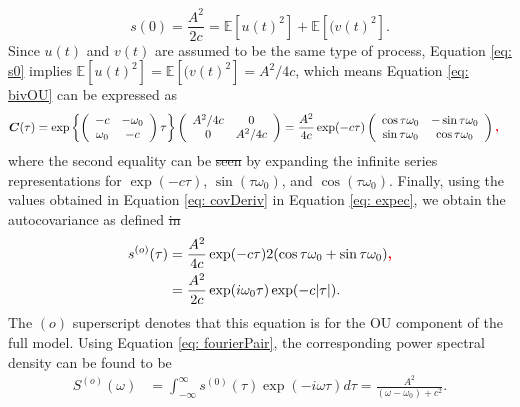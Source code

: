 \documentclass{stat572Style}
\newcommand{\vmdel}[1]{\sout{#1}}
\newcommand{\vmadd}[1]{\textbf{\color{red}{#1}}}
\begin{document}
\begin{equation}
\label{eq: s0}
s(0) = \frac{A^{2}}{2c} =  \mathbb{E}[u(t)^{2}] + \mathbb{E}[(v(t)^{2}]. 
\end{equation}
Since $u(t)$ and $v(t)$ are assumed to be the same type of process, Equation \eqref{eq: s0} implies $\mathbb{E}[u(t)^{2}] =\mathbb{E}[(v(t)^{2}] = A^{2}/4c$, which means Equation \eqref{eq: bivOU} can be expressed as 
\begin{align}
\label{eq: covDeriv}
 \boldsymbol{C}(\tau) =  \exp \left\{ \left( \begin{array}{cc} -c & -\omega_{0} \\ \omega_{0} & -c \end{array} \right)\tau \right\} \left( \begin{array}{cc} A^{2}/4c & 0 \\ 0 & A^{2}/4c \end{array} \right)  &= 
\frac{A^{2}}{4c} \exp (-c \tau) \left( \begin{array}{cc} \cos \tau \omega_{0} & - \sin \tau \omega_{0} \\ \sin \tau \omega_{0} & \cos \tau \omega_{0}  \end{array} \right)\vmadd{,}
\end{align}
where the second equality can be \vmdel{seen} \vmadd{obtained} by expanding the infinite series representations for $\exp(-c \tau)$, $\sin(\tau \omega_{0})$, and $\cos( \tau \omega_{0})$. 
Finally, using the values obtained in Equation \eqref{eq: covDeriv} in Equation \eqref{eq: expec}, we obtain the autocovariance  as defined \vmdel{in} \vmadd{by} \citet{Sykulski2016}\vmadd{:}
\begin{align}
\label{eq: ouAC} \nonumber
s^{(o)}(\tau) & = \frac{A^{2}}{4c} \exp(-c\tau) 2(\cos \tau \omega_{0} + \sin \tau \omega_{0})\vmadd{,} \\
&= \frac{A^{2}}{2c} \exp(i \omega_{0}\tau) \exp(-c|\tau|).
\end{align}
 The $(o)$ superscript denotes that this equation is for the OU component of the full model. Using Equation \eqref{eq: fourierPair}, the corresponding power spectral density can be found to be\begin{align}
\label{eq:ouPSD}
S^{(o)}(\omega) &=  \int_{-\infty}^{\infty} s^{(0)}(\tau) \exp (-i \omega \tau) d \tau = \frac{A^{2}}{(\omega - \omega_{0}) + c^{2}}. 
\end{align}
\end{document}
